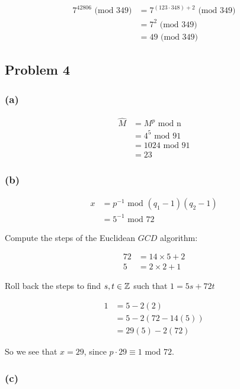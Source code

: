 \documentclass[10pt]{article}
\begin{document}
\begin{align*}
  7^{42806} \text{ (mod 349)} &= 7^{(123 \cdot 348) + 2} \text{ (mod 349)} \\
    &= 7^2 \text{ (mod 349)} \\
    &= 49 \text{ (mod 349)}
\end{align*}

\newpage
\subsection*{Problem 4}

\subsubsection*{(a)}

\begin{align*}
  \hat{M} &= M^p \text{ mod n} \\
    &= 4^5 \text{ mod 91} \\
    &= 1024 \text{ mod 91} \\
    &= 23
\end{align*}

\subsubsection*{(b)}

\begin{align*}
  x &= p^{-1} \text{ mod $(q_{1} - 1)(q_{2} - 1)$} \\
    &= 5^{-1} \text{ mod 72}
\end{align*}

\spacing
\noindent
Compute the steps of the Euclidean $GCD$ algorithm:

\begin{align*}
  72 &= 14 \times 5 + 2 \\
  5 &= 2 \times 2 + 1
\end{align*}

\spacing
\noindent
Roll back the steps to find $s, t \in \mathbb{Z}$ such that $1 = 5s + 72t$

\begin{align*}
  1 &= 5 - 2(2) \\
    &= 5 - 2(72 - 14(5)) \\
    &= 29(5) - 2(72)
\end{align*}

\noindent
So we see that $x = 29$, since $p \cdot 29 \equiv 1$ mod $72$.

\subsubsection*{(c)}
\end{document}
